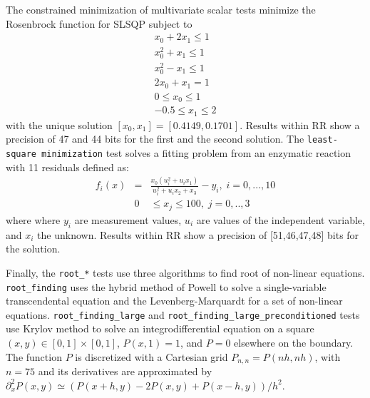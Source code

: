 \documentclass[11pt]{article}
\begin{document}
The constrained minimization of multivariate scalar tests minimize the Rosenbrock function for SLSQP subject to
\begin{eqnarray*}
    x_0 + 2x_1 \leq 1 \\
    x_0^2 + x_1 \leq 1 \\
    x_0^2 - x_1 \leq 1 \\
    2x_0 + x_1 = 1 \\
    0 \leq x_0 \leq 1 \\
    -0.5 \leq x_1 \leq 2 
\end{eqnarray*}
with the unique solution $[x_0, x_1] = [0.4149, 0.1701]$.
Results within RR show a precision of 47 and 44 bits for the first and the second solution.
The \texttt{least-square minimization} test solves a fitting problem from an enzymatic reaction~\cite{kowalik1968analysis} with 11 residuals defined as:
\begin{eqnarray*}
f_i(x) &=& \frac{x_0(u_i^2 + u_ix_1)}{u_i^2 + u_ix_2+x_3}-y_i,\; i=0,...,10 \\
&0& \leq x_j \leq 100,\; j=0,..,3
\end{eqnarray*}
where where $y_i$ are measurement values, $u_i$ are values of the independent variable, and
$x_i$ the unknown.
Results within RR show a precision of [51,46,47,48] bits for the solution.

Finally, the \texttt{root\_*} tests use three algorithms to 
find root of non-linear equations. \texttt{root\_finding}
uses the hybrid method of Powell to solve a single-variable transcendental equation and 
the Levenberg-Marquardt for a set of non-linear equations. 
\texttt{root\_finding\_large} and \texttt{root\_finding\_large\_preconditioned} tests use 
Krylov method to solve an integrodifferential equation on a square
 $(x,y) \in [0,1] \times [0,1]$, $P(x,1)=1$, and $P=0$ elsewhere on the boundary.
The function $P$ is discretized with a Cartesian grid $P_{n,n}=P(nh,nh)$, with $n=75$ and its derivatives are approximated by $\partial_x^2P(x,y) \simeq (P(x+h,y) - 2P(x,y) + P(x-h,y))/h^2$.

\end{document}
